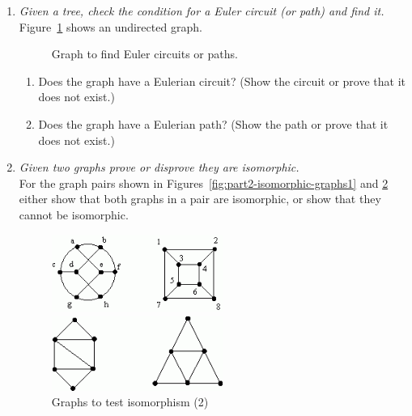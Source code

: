 \documentclass[a4paper,12pt]{article}
\begin{document}
\begin{enumerate}
\item {\small \em  Given a tree, check the condition for a Euler circuit (or path) and find it.}\\
Figure~\ref{fig:part2-eulerian-graph} shows an undirected graph.
\begin{figure}[!htb]
\caption{\label{fig:part2-eulerian-graph} Graph to find Euler circuits or paths.}
\end{figure}
\begin{enumerate}
\item Does the graph have a Eulerian circuit? (Show the circuit or prove that it does
not exist.)
\item Does the graph have a Eulerian path? (Show the path or prove that it does
not exist.)
\end{enumerate}





\item {\small \em  Given two graphs prove or disprove they are isomorphic.}\\
For the graph pairs shown in Figures~\ref{fig:part2-isomorphic-graphs1} and
\ref{fig:part2-isomorphic-graphs2} either show that both
graphs in a pair are isomorphic, or show that they cannot be isomorphic.
\begin{figure}[!htb]
\centering
\begin{minipage}{.5\textwidth}
\centering
\includegraphics[width=2.2in]{figs/part2-isomorphic-graphs1.png}
\caption{Graphs to test isomorphism (1)}
\label{fig:part2-isomorphic-graphs1}
\end{minipage}%
\begin{minipage}{0.5\textwidth}
\centering
\includegraphics[width=2.2in]{figs/part2-isomorphic-graphs2.png}
\caption{Graphs to test isomorphism (2)}
\label{fig:part2-isomorphic-graphs2}
\end{minipage}
\end{figure}
\end{enumerate}
\end{document}
